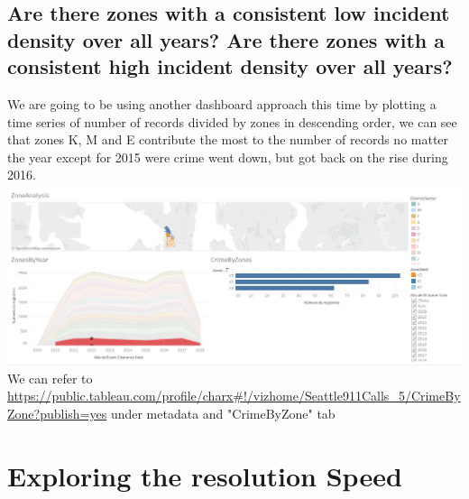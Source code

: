 \documentclass{article}
\begin{document}
    \subsection{Are there zones with a consistent low incident density over all years? Are there zones	with a consistent high incident	density	over all years?}
    We are going to be using another dashboard approach this time by plotting a time series of number of records divided by zones in descending order, we can see that zones K, M and E contribute the most to the number of records no matter the year except for 2015 were crime went down, but got back on the rise during 2016.
    \\
    \includegraphics[width=\textwidth]{VisualAnalytics/Assignment2/images/CrimeByZoneDashboard.PNG}
    \\
    We can refer to \url{https://public.tableau.com/profile/charx#!/vizhome/Seattle911Calls_5/CrimeByZone?publish=yes} under metadata and "CrimeByZone" tab
    
\section{Exploring the resolution Speed}
\end{document}
